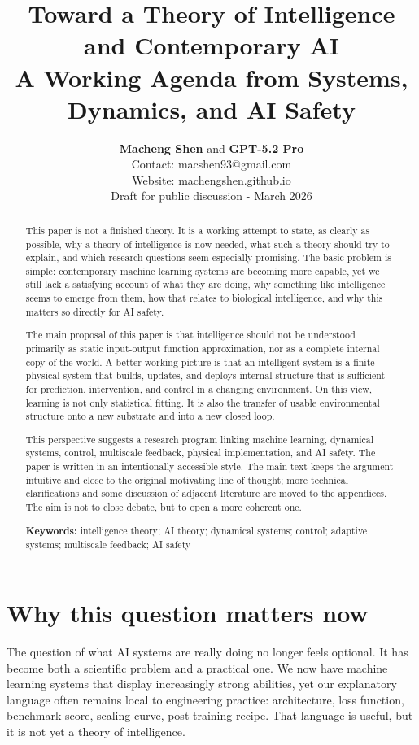 \documentclass[11pt]{article}
\title{Toward a Theory of Intelligence and Contemporary AI\\\large A Working Agenda from Systems, Dynamics, and AI Safety}
\author{\textbf{Macheng Shen} and \textbf{GPT-5.2 Pro}\\Contact: macshen93@gmail.com\\Website: machengshen.github.io\\Draft for public discussion - March 2026}
\date{}
\begin{document}
\maketitle

\begin{abstract}

This paper is not a finished theory. It is a working attempt to state, as clearly as possible, why a theory of intelligence is now needed, what such a theory should try to explain, and which research questions seem especially promising. The basic problem is simple: contemporary machine learning systems are becoming more capable, yet we still lack a satisfying account of what they are doing, why something like intelligence seems to emerge from them, how that relates to biological intelligence, and why this matters so directly for AI safety.

The main proposal of this paper is that intelligence should not be understood primarily as static input-output function approximation, nor as a complete internal copy of the world. A better working picture is that an intelligent system is a finite physical system that builds, updates, and deploys internal structure that is sufficient for prediction, intervention, and control in a changing environment. On this view, learning is not only statistical fitting. It is also the transfer of usable environmental structure onto a new substrate and into a new closed loop.

This perspective suggests a research program linking machine learning, dynamical systems, control, multiscale feedback, physical implementation, and AI safety. The paper is written in an intentionally accessible style. The main text keeps the argument intuitive and close to the original motivating line of thought; more technical clarifications and some discussion of adjacent literature are moved to the appendices. The aim is not to close debate, but to open a more coherent one.

\textbf{Keywords:} intelligence theory; AI theory; dynamical systems; control; adaptive systems; multiscale feedback; AI safety

\end{abstract}

\section{Why this question matters now}

The question of what AI systems are really doing no longer feels optional. It has become both a scientific problem and a practical one. We now have machine learning systems that display increasingly strong abilities, yet our explanatory language often remains local to engineering practice: architecture, loss function, benchmark score, scaling curve, post-training recipe. That language is useful, but it is not yet a theory of intelligence.
\end{document}
